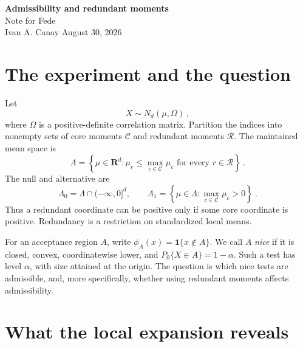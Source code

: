 \documentclass[11pt]{article}
\newcommand{\R}{\mathbf R}
\newcommand{\cC}{\mathcal C}
\newcommand{\cR}{\mathcal R}
\newcommand{\1}{\mathbf 1}
\begin{document}
\begin{center}
{\Large\bfseries\color{navy} Admissibility and redundant moments}\\[3pt]
{\large Note for Fede}\\[5pt]
{\small Ivan A. Canay \quad August 30, 2026}
\end{center}


\section{The experiment and the question}

Let
\[
X\sim N_d(\mu,\Omega)~,
\]
where $\Omega$ is a positive-definite correlation matrix.  Partition the
indices into nonempty sets of core moments $\cC$ and redundant moments
$\cR$.  The maintained mean space is
\[
\Lambda
=
\left\{\mu\in\R^d:
\mu_r\le \max_{c\in\cC}\mu_c
\text{ for every }r\in\cR
\right\}~.
\]
The null and alternative are
\[
\Lambda_0=\Lambda\cap(-\infty,0]^d,
\qquad
\Lambda_1=\left\{\mu\in\Lambda:
\max_{c\in\cC}\mu_c>0\right\}~.
\]
Thus a redundant coordinate can be positive only if some core coordinate is
positive.  Redundancy is a restriction on standardized local means.  

For an acceptance region $A$, write $\phi_A(x)=\1\{x\notin A\}$.  We call
$A$ \emph{nice} if it is closed, convex, coordinatewise lower, and
$P_0\{X\in A\}=1-\alpha$.  Such a test has level $\alpha$, with size attained at
the origin.  The question is which nice tests are admissible, and, more
specifically, whether using redundant moments affects admissibility.

\section{What the local expansion reveals}
\end{document}
